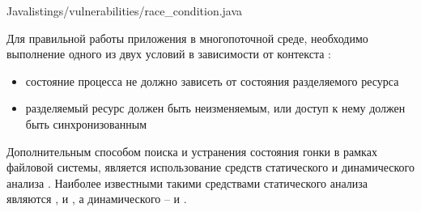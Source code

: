	{Java}{listings/vulnerabilities/race_condition.java}

%
Для правильной работы приложения в многопоточной среде, необходимо выполнение одного из двух 
условий в зависимости от контекста  : 
\begin{itemize}
	\item состояние процесса не должно зависеть от состояния разделяемого ресурса
	\item разделяемый ресурс должен быть неизменяемым, или доступ к нему должен быть 
		синхронизованным 
\end{itemize}

%
Дополнительным способом поиска и устранения состояния гонки в рамках файловой системы, является 
использование средств статического и динамического анализа . 
%
Наиболее известными такими средствами статического анализа являются  , 
  и  , а динамического – 
  и  . 
